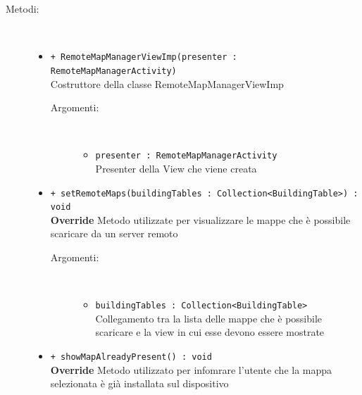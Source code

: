 \documentclass[../DefinizioneDiProdotto.tex]{subfiles}
\begin{document}
\begin{description}
\begin{itemize}
	\end{itemize}
	\item[Metodi:] \
	\begin{itemize}
		\item \texttt{+ RemoteMapManagerViewImp(presenter : RemoteMapManagerActivity)}\\
		Costruttore della classe RemoteMapManagerViewImp
		\begin{description}
			\item[Argomenti:] \
			\begin{itemize}
				\item \texttt{presenter : RemoteMapManagerActivity}\\
				Presenter della View che viene creata\end{itemize}
		\end{description}
		\item \texttt{+ setRemoteMaps(buildingTables : Collection<BuildingTable>) : void}\\
		\textbf{Override} Metodo utilizzate per visualizzare le mappe che è possibile scaricare da un server remoto
		\begin{description}
			\item[Argomenti:] \
			\begin{itemize}
				\item \texttt{buildingTables : Collection<BuildingTable>}\\
				Collegamento tra la lista delle mappe che è possibile scaricare e la view in cui esse devono essere mostrate\end{itemize}
		\end{description}
		\item \texttt{+ showMapAlreadyPresent() : void}\\
		\textbf{Override} Metodo utilizzato per infomrare l'utente che la mappa selezionata è già installata sul dispositivo
	\end{itemize}
\end{description}
\end{document}

